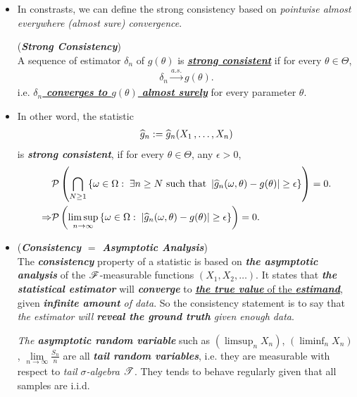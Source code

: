 \documentclass[11pt]{article}
\begin{document}
\begin{itemize}
\item In constrasts, we can define the strong consistency based on \emph{pointwise almost everywhere (almost sure) convergence}.
\begin{definition} (\emph{\textbf{Strong Consistency}}) \citep{lehmann1998theory, resnick2013probability} \\
A sequence of estimator $\delta_{n}$ of $g(\theta)$ is \underline{\emph{\textbf{strong consistent}}} if for every $\theta \in \Theta$, 
\begin{align*}
\delta_{n} \stackrel{a.s.}{\rightarrow} g(\theta).
\end{align*} i.e. \underline{\emph{\textbf{$\delta_{n}$ converges to $g(\theta)$ almost surely}}} for every parameter $\theta$.
\end{definition}

\item \begin{remark}
In other word, the statistic
\begin{align*}
\widehat{g}_{n} := \widehat{g}_{n}(X_1 \,{,}\ldots{,}\, X_n)
\end{align*} is \emph{\textbf{strong consistent}}, if for every $\theta \in \Theta$, any $\epsilon >0$, 
\begin{align*}
&{\mathcal P}\left(\bigcap_{N \ge 1}\left\{\omega \in \Omega:\; \exists n \ge N \text{ such that } \left\lvert \widehat{g}_{n}(\omega, \theta) - g(\theta) \right\rvert \ge \epsilon\right\} \right) = 0. \\
\Rightarrow & {\mathcal P}\left(\limsup\limits_{n \rightarrow \infty}\left\{\omega \in \Omega:\; \left\lvert \widehat{g}_{n}(\omega, \theta) - g(\theta) \right\rvert \ge \epsilon\right\} \right) = 0.
\end{align*}
\end{remark}

\item \begin{remark} (\emph{\textbf{Consistency $=$ Asymptotic Analysis}})\\
The \emph{\textbf{consistency}} property of a statistic is based on \emph{\textbf{the asymptotic analysis}} of the ${\mathscr F}$-measurable functions $(X_1, X_2, \ldots)$. It states that \emph{\textbf{the statistical estimator}} will \emph{\textbf{converge}} to \underline{\emph{\textbf{the true value}} of the \emph{\textbf{estimand}}}, given \emph{\textbf{infinite amount} of data}. So the consistency statement is to say that \emph{the estimator will \textbf{reveal the ground truth} given enough data}.

\emph{The \textbf{asymptotic random variable}} such as $(\limsup_{n}X_n)$, $(\liminf_{n}X_n)$, $\lim\limits_{n\rightarrow \infty}\frac{S_n}{n}$ are all \emph{\textbf{tail random variables}}, i.e. they are measurable with respect to \emph{tail $\sigma$-algebra ${\mathscr T}$}. They tends to behave regularly given that all samples are i.i.d.
\end{remark}



\end{itemize}
\end{document}
